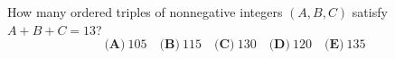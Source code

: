 How many ordered triples of nonnegative integers $(A,B,C)$ satisfy $A+B+C=13$?
\[\textbf{(A)}~105\quad\textbf{(B)}~115\quad\textbf{(C)}~130\quad\textbf{(D)}~120\quad\textbf{(E)}~135\]

